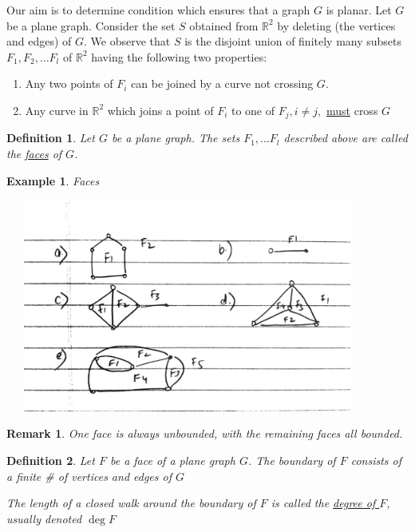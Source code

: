 \documentclass[12pt]{article}
\newtheorem{example}{Example}
\newtheorem{definition}{Definition}
\newtheorem*{remark}{Remark}
\begin{document}
Our aim is to determine condition which ensures that a graph $G$ is planar. Let $G$ be a plane graph. Consider the set $S$ obtained from $\mathbb{R}^{2}$ by deleting (the vertices and edges) of $G$.
We observe that $S$ is the disjoint union of finitely many subsets $F_{1}, F_{2},\dots F_{l}$ of $\mathbb{R}^{2}$ having the following two properties:

\begin{enumerate}
	\item Any two points of $F_{i}$ can be joined by a curve not crossing $G$.
	\item Any curve in $\mathbb{R}^{2}$ which joins a point of $F_{i}$ to one of $F_{j}, i\neq j, $ \underline{must} cross $G$
\end{enumerate}


\begin{definition}
	Let $G$ be a plane graph. The sets $F_{1}, \dots F_{l}$ described above are called the \underline{faces} of $G$.
\end{definition}

\begin{example}\label{a-thm}
	Faces

	\begin{center}
		\includegraphics[width=12cm, height=7cm]{example2}
	\end{center}

\end{example}

\begin{remark}
	One face is always unbounded, with the remaining faces all bounded.
\end{remark}


\begin{definition}
	Let $F$ be a face of a plane graph $G$. The boundary of $F$ consists of a finite \# of vertices and edges of $G$

	The length of a closed walk around the boundary of $F$ is called the \underline{degree of $F$}, usually denoted $\deg F$

\end{definition}
\end{document}
